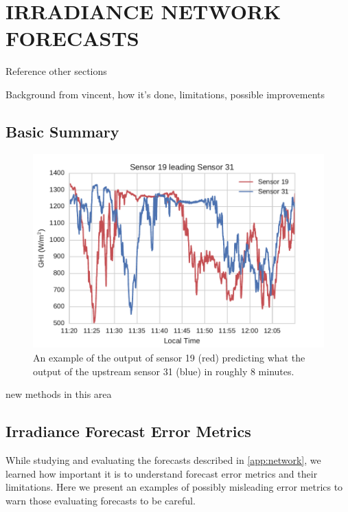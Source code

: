 \chapter{IRRADIANCE NETWORK FORECASTS}
\label{chap:network}

Reference other sections


Background from vincent, how it's done, limitations, possible
improvements

\section{Basic Summary}
\begin{figure}[h]
\includegraphics[width=\textwidth]{figs/leading_sens.pdf}
\caption[Example of data from one sensor predicting the output of
another]{An example of the output of sensor 19 (red) predicting what
  the output of the upstream sensor 31 (blue) in roughly 8
  minutes.}
\label{fig:leading_sens}
\end{figure}


new methods in this area

\section{Irradiance Forecast Error Metrics}
\label{sec:error_metrics}

While studying and evaluating the forecasts described in
\cref{app:network}, we learned how important it is to understand
forecast error metrics and their limitations.
Here we present an examples of possibly misleading error metrics to
warn those evaluating forecasts to be careful.

